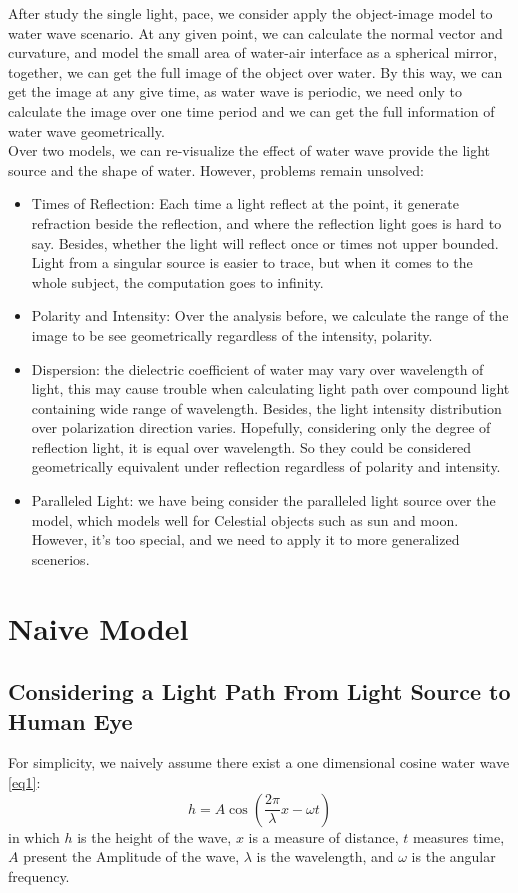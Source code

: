 \documentclass[conference]{IEEEtran}
\begin{document}
After study the single light, pace, we consider apply the object-image model to water wave scenario. At any given point, we can calculate the normal vector and curvature, and model the small area of water-air interface as a spherical mirror, together, we can get the full image of the object over water. By this way, we can get the image at any give time, as water wave is periodic, we need only to calculate the image over one time period and we can get the full information of water wave geometrically.\\

Over two models, we can re-visualize the effect of water wave provide the light source and the shape of water. However, problems remain unsolved:\\
\begin{itemize}
\item Times of Reflection: Each time a light reflect at the point, it generate refraction beside the reflection, and where the reflection light goes is hard to say. Besides, whether the light will reflect once or times not upper bounded. Light from a singular source is easier to trace, but when it comes to the whole subject, the computation goes to infinity.
\item Polarity and Intensity: Over the analysis before, we calculate the range of the image to be see geometrically regardless of the intensity, polarity.
\item Dispersion: the dielectric coefficient of water may vary over wavelength of light, this may cause trouble when calculating light path over compound light containing wide range of wavelength. Besides, the light intensity distribution over polarization direction varies. Hopefully, considering only the degree of reflection light, it is  equal over wavelength. So they could be considered geometrically equivalent under reflection regardless of  polarity and intensity.
\item Paralleled Light: we have being consider the paralleled light source over the model, which models well for Celestial objects such as sun and moon. However, it’s too special, and we need to apply it to more generalized scenerios. 
\end{itemize}

\section{Naive Model}

\subsection{Considering a Light Path From Light Source to Human Eye}
For simplicity, we naively assume there exist a one dimensional cosine water wave \eqref{eq1}:
\begin{equation}
h = A \cos(\frac{2\pi}{\lambda}x- \omega t)\label{eq1}
\end{equation}
in which $h$ is the height of the wave, $x$ is a measure of distance, $t$ measures time, $A$ present the Amplitude of the wave, $\lambda$ is the wavelength, and $\omega$ is the angular frequency. \\
\end{document}
